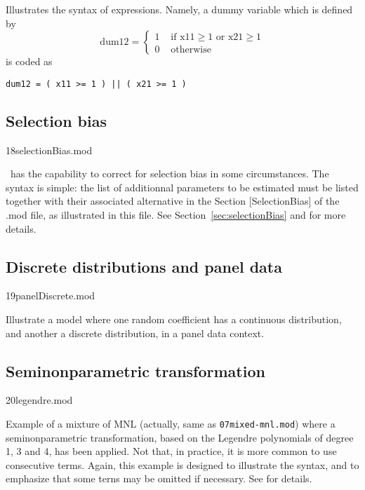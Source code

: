 \documentclass[12pt]{memoir}
\begin{document}
Illustrates the syntax of expressions. Namely, a dummy variable which is defined by
\[
\text{dum12} = \left\{ 
\begin{array}{ll}
1 & \text{ if x11} \geq 1 \text{ or x21} \geq 1 \\
0 & \text{ otherwise}
\end{array}
\right.
\]
is coded as
{\footnotesize
\begin{verbatim}
dum12 = ( x11 >= 1 ) || ( x21 >= 1 )
\end{verbatim}
}

\subsection{Selection bias}

\begin{flushright}
  18selectionBias.mod
\end{flushright}

\BIOGEME\ has the capability to correct for selection bias in some
circumstances. The syntax is simple: the list of additionnal
parameters to be estimated must be listed together with their
associated alternative in the Section
[SelectionBias] of the .mod file, as illustrated in this file. See
Section~\ref{sec:selectionBias} and \cite{BierBoldMcFa08} for more
details.

\subsection{Discrete distributions and panel data}
\begin{flushright}
  19panelDiscrete.mod
\end{flushright}

Illustrate a model where one random coefficient has a continuous distribution, and another a discrete distribution, in a panel data context. 


\subsection{Seminonparametric transformation}

\begin{flushright}
  20legendre.mod
\end{flushright}

Example of a mixture of MNL (actually, same as \verb+07mixed-mnl.mod+)
where a seminonparametric transformation, based on the Legendre
polynomials of degree 1, 3 and 4, has been applied. Not that, in practice, it is more common to use consecutive terms. Again, this example is designed to illustrate the syntax, and to emphasize that some terns may be omitted if necessary. See  for details.
\end{document}
